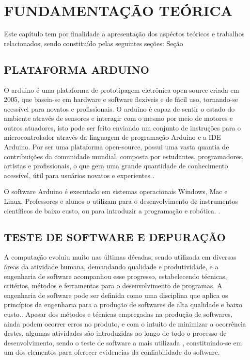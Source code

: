
\chapter{FUNDAMENTAÇÃO TEÓRICA}
\label{chap:fundamentacao-teorica}Este capítulo tem por finalidade a apresentação dos aspéctos teóricos e trabalhos relacionados, sendo constituído pelas seguintes seções: Seção 

\section{PLATAFORMA ARDUINO}
\label{sec:arduino} O arduino é uma plataforma de prototipagem eletrônica open-source criada em 2005, que baseia-se em hardware e software flexíveis e de fácil uso, tornando-se acessível para novatos e profissionais. O arduino é capaz de sentir o estado do ambiente através de sensores e interagir com o mesmo por meio de motores e outros atuadores, isto pode ser feito enviando um conjunto de instruções para o microcontrolador através da linguagem de programação Arduino e a IDE Arduino. Por ser uma plataforma open-source, possui uma vasta quantia de contribuições da comunidade mundial, composta por estudantes, programadores, artistas e profissionais, o que gera uma grande quantidade de conhecimento acessível, útil para usuários novatos e experientes \cite{arduino2018}.

O software Arduino é executado em sistemas operacionais Windows, Mac e Linux. Professores e alunos o utilizam para o desenvolvimento de instrumentos científicos de baixo custo, ou para introduzir a programação e robótica. \cite{arduino2018}.

\section{TESTE DE SOFTWARE E DEPURAÇÃO}
\label{sec:testedeploy} A computação evoluiu muito nas últimas décadas, sendo utilizada em diversas áreas da atividade humana, demandando qualidade e produtividade, e a engenharia de software acompanhou esse progresso, estabelecendo técnicas, critérios, métodos e ferramentas para o desenvolvimento de programas. A engenharia de software pode ser definida como uma disciplina que aplica os princípios da engenharia para a produção de softwares de alta qualidade e baixo custo.\cite{Pressman1997}. Apesar dos métodos e técnicas empregadas na produção de softwares, ainda podem ocorrer erros no produto, e com o intuito de minimizar a ocorrência destes, algumas atividades são introduzidas ao longo de todo o processo de desenvolvimento, sendo o teste de software a mais utilizada \cite{Maldonado1997}, constituindo-se em um dos elementos para oferecer evidencias da confiabilidade do software.

